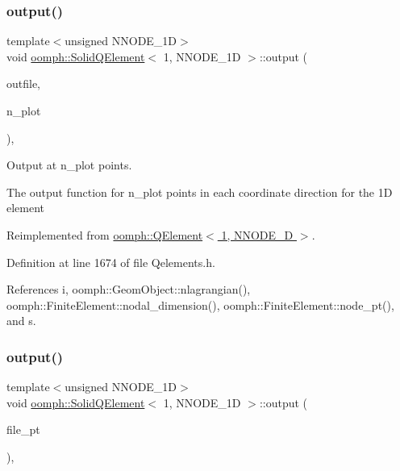 \subsubsection{\texorpdfstring{output()}{output()}\hspace{0.1cm}{\footnotesize\ttfamily [2/4]}}
{\footnotesize\ttfamily template$<$unsigned N\+N\+O\+D\+E\+\_\+1D$>$ \\
void \hyperlink{classoomph_1_1SolidQElement}{oomph\+::\+Solid\+Q\+Element}$<$ 1, N\+N\+O\+D\+E\+\_\+1D $>$\+::output (\begin{DoxyParamCaption}\item[{std\+::ostream \&}]{outfile,  }\item[{const unsigned \&}]{n\+\_\+plot }\end{DoxyParamCaption})\hspace{0.3cm}{\ttfamily [inline]}, {\ttfamily [virtual]}}



Output at n\+\_\+plot points. 

The output function for n\+\_\+plot points in each coordinate direction for the 1D element 

Reimplemented from \hyperlink{classoomph_1_1QElement_3_011_00_01NNODE__1D_01_4_a19fb7fd1e4def7132018d2aa0e6c00d7}{oomph\+::\+Q\+Element$<$ 1, N\+N\+O\+D\+E\+\_\+D $>$}.



Definition at line 1674 of file Qelements.\+h.



References i, oomph\+::\+Geom\+Object\+::nlagrangian(), oomph\+::\+Finite\+Element\+::nodal\+\_\+dimension(), oomph\+::\+Finite\+Element\+::node\+\_\+pt(), and s.

\mbox{\label{classoomph_1_1SolidQElement_3_011_00_01NNODE__1D_01_4_a48a580c256586164ec6ba559e100eb0f}} 
\subsubsection{\texorpdfstring{output()}{output()}\hspace{0.1cm}{\footnotesize\ttfamily [3/4]}}
{\footnotesize\ttfamily template$<$unsigned N\+N\+O\+D\+E\+\_\+1D$>$ \\
void \hyperlink{classoomph_1_1SolidQElement}{oomph\+::\+Solid\+Q\+Element}$<$ 1, N\+N\+O\+D\+E\+\_\+1D $>$\+::output (\begin{DoxyParamCaption}\item[{F\+I\+LE $\ast$}]{file\+\_\+pt }\end{DoxyParamCaption})\hspace{0.3cm}{\ttfamily [inline]}, {\ttfamily [virtual]}}



